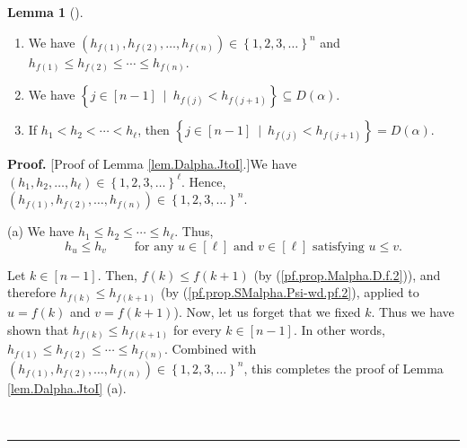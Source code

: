 \documentclass[numbers=enddot,12pt,final,onecolumn,notitlepage,abstracton]{scrartcl}
\theoremstyle{definition}
\newtheorem{lem}[theo]{Lemma}
\newenvironment{lemma}[1][]
{\begin{lem}[#1]\begin{leftbar}}
{\end{leftbar}\end{lem}}
\newenvironment{proof}[1][Proof]{\noindent\textbf{#1.} }{\ \rule{0.5em}{0.5em}}
\newenvironment{verlong}{}{}
\begin{document}
\begin{verlong}
\begin{footnotesize}
\begin{lemma}
\begin{enumerate}
\item[(a)] We have $\left(  h_{f\left(  1\right)  },h_{f\left(  2\right)
},\ldots,h_{f\left(  n\right)  }\right)  \in\left\{  1,2,3,\ldots\right\}
^{n}$ and $h_{f\left(  1\right)  }\leq h_{f\left(  2\right)  }\leq\cdots\leq
h_{f\left(  n\right)  }$.

\item[(b)] We have $\left\{  j\in\left[  n-1\right]  \ \mid\ h_{f\left(
j\right)  }<h_{f\left(  j+1\right)  }\right\}  \subseteq D\left(
\alpha\right)  $.

\item[(c)] If $h_{1}<h_{2}<\cdots<h_{\ell}$, then $\left\{  j\in\left[
n-1\right]  \ \mid\ h_{f\left(  j\right)  }<h_{f\left(  j+1\right)  }\right\}
=D\left(  \alpha\right)  $.
\end{enumerate}
\end{lemma}

\begin{proof}
[Proof of Lemma \ref{lem.Dalpha.JtoI}.]We have $\left(  h_{1},h_{2}%
,\ldots,h_{\ell}\right)  \in\left\{  1,2,3,\ldots\right\}  ^{\ell}$. Hence,
\newline
$\left(  h_{f\left(  1\right)  },h_{f\left(  2\right)  },\ldots,h_{f\left(
n\right)  }\right)  \in\left\{  1,2,3,\ldots\right\}  ^{n}$.

(a) We have $h_{1}\leq h_{2}\leq\cdots\leq h_{\ell}$. Thus,%
\begin{equation}
h_{u}\leq h_{v}\ \ \ \ \ \ \ \ \ \ \text{for any }u\in\left[  \ell\right]
\text{ and }v\in\left[  \ell\right]  \text{ satisfying }u\leq v.
\label{pf.prop.SMalpha.Psi-wd.pf.2}%
\end{equation}


Let $k\in\left[  n-1\right]  $. Then, $f\left(  k\right)  \leq f\left(
k+1\right)  $ (by (\ref{pf.prop.Malpha.D.f.2})), and therefore $h_{f\left(
k\right)  }\leq h_{f\left(  k+1\right)  }$ (by
(\ref{pf.prop.SMalpha.Psi-wd.pf.2}), applied to $u=f\left(  k\right)  $ and
$v=f\left(  k+1\right)  $). Now, let us forget that we fixed $k$. Thus we have
shown that $h_{f\left(  k\right)  }\leq h_{f\left(  k+1\right)  }$ for every
$k\in\left[  n-1\right]  $. In other words, $h_{f\left(  1\right)  }\leq
h_{f\left(  2\right)  }\leq\cdots\leq h_{f\left(  n\right)  }$. Combined with
$\left(  h_{f\left(  1\right)  },h_{f\left(  2\right)  },\ldots,h_{f\left(
n\right)  }\right)  \in\left\{  1,2,3,\ldots\right\}  ^{n}$, this completes
the proof of Lemma \ref{lem.Dalpha.JtoI} (a).


\end{proof}
\end{footnotesize}
\end{verlong}
\end{document}
